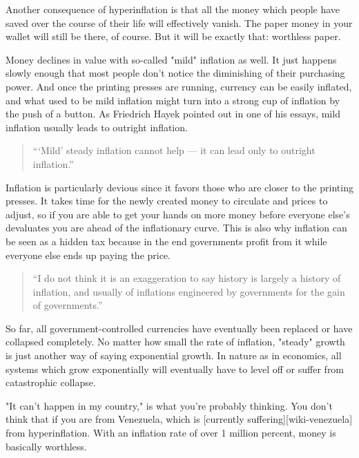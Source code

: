 Another consequence of hyperinflation is that all the money which people
have saved over the course of their life will effectively vanish. The
paper money in your wallet will still be there, of course. But it will
be exactly that: worthless paper.



Money declines in value with so-called "mild" inflation as well. It
just happens slowly enough that most people don't notice the diminishing
of their purchasing power. And once the printing presses are running,
currency can be easily inflated, and what used to be mild inflation
might turn into a strong cup of inflation by the push of a button. As
Friedrich Hayek pointed out in one of his essays, mild inflation usually
leads to outright inflation.

\begin{quotation}
```Mild' steady inflation cannot help --- it can lead only to outright
inflation.''
\end{quotation}

Inflation is particularly devious since it favors those who are closer
to the printing presses. It takes time for the newly created money to
circulate and prices to adjust, so if you are able to get your hands on
more money before everyone else's devaluates you are ahead of the
inflationary curve. This is also why inflation can be seen as a hidden
tax because in the end governments profit from it while everyone else
ends up paying the price.

\begin{quotation}
``I do not think it is an exaggeration to say history is largely a
history of inflation, and usually of inflations engineered by
governments for the gain of governments.''
\end{quotation}

So far, all government-controlled currencies have eventually been
replaced or have collapsed completely. No matter how small the rate of
inflation, "steady" growth is just another way of saying exponential
growth. In nature as in economics, all systems which grow exponentially
will eventually have to level off or suffer from catastrophic collapse.

"It can't happen in my country," is what you're probably thinking. You
don't think that if you are from Venezuela, which is [currently
suffering][wiki-venezuela] from hyperinflation. With an inflation rate of over 1 million
percent, money is basically worthless.

